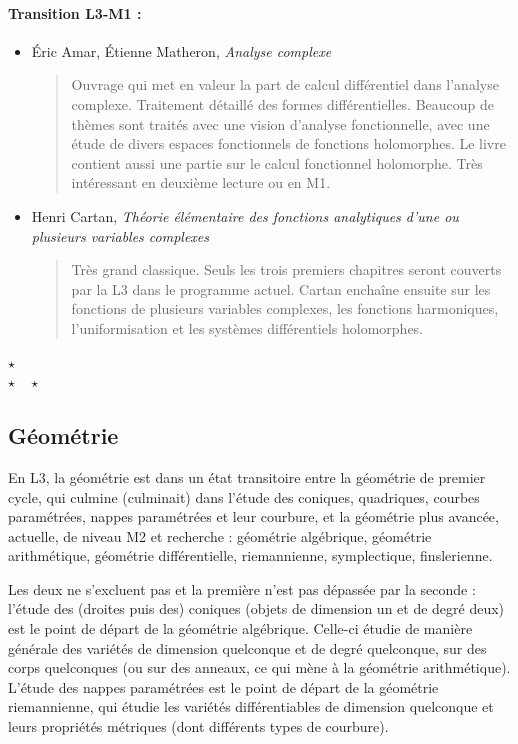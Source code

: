 \documentclass{article}
\def\separateur{\begin{center}
$\star$\\
$\star\quad\star$
\end{center}}
\begin{document}
\paragraph{Transition L3-M1 :}
\begin{itemize}
\item Éric Amar, Étienne Matheron, \emph{Analyse complexe}
\begin{quote}
Ouvrage qui met en valeur la part de calcul différentiel dans l'analyse complexe. Traitement détaillé des formes différentielles. Beaucoup de thèmes sont traités avec une vision d'analyse fonctionnelle, avec une étude de divers espaces fonctionnels de fonctions holomorphes. Le livre contient aussi une partie sur le calcul fonctionnel holomorphe. Très intéressant en deuxième lecture ou en M1.
\end{quote}
\item Henri Cartan, \emph{Théorie élémentaire des fonctions analytiques d'une ou plusieurs variables complexes}
\begin{quote}
Très grand classique. Seuls les trois premiers chapitres seront couverts par la L3 dans le programme actuel. Cartan enchaîne ensuite sur les fonctions de plusieurs variables complexes, les fonctions harmoniques, l'uniformisation et les systèmes différentiels holomorphes.
\end{quote}
\end{itemize}

\separateur
\subsection{Géométrie}

En L3, la géométrie est dans un état transitoire entre la géométrie de premier cycle, qui culmine (culminait) dans l'étude des coniques, quadriques, courbes paramétrées, nappes paramétrées et leur courbure, et la géométrie plus avancée, actuelle, de niveau M2 et recherche : géométrie algébrique, géométrie arithmétique, géométrie différentielle, riemannienne, symplectique, finslerienne.

Les deux ne s'excluent pas et la première n'est pas \og dépassée\fg{} par la seconde : l'étude des (droites puis des) coniques (objets de dimension un et de degré deux) est le point de départ de la géométrie algébrique. Celle-ci étudie de manière générale des variétés de dimension quelconque et de degré quelconque, sur des corps quelconques (ou sur des anneaux, ce qui mène à la géométrie arithmétique). L'étude des nappes paramétrées est le point de départ de la géométrie riemannienne, qui étudie les variétés différentiables de dimension quelconque et leurs propriétés métriques (dont différents types de courbure).
\end{document}
